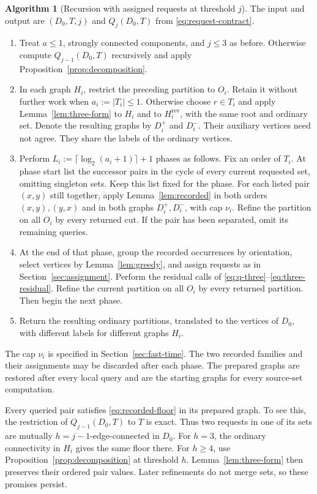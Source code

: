 \documentclass[11pt]{article}
\theoremstyle{definition}
\newtheorem{algorithm}[theorem]{Algorithm}
\theoremstyle{remark}
\newcommand{\rev}[1]{#1^{\mathrm{rev}}}
\begin{document}
\begin{algorithm}[Recursion with assigned requests at threshold \(j\)]
\label{alg:fast}
The input and output are \((D_0,T,j)\) and \(Q_j(D_0,T)\) from \eqref{eq:request-contract}.
\begin{enumerate}
\item Treat \(a\le1\), strongly connected components, and \(j\le3\) as before. Otherwise compute \(Q_{j-1}(D_0,T)\) recursively and apply Proposition~\ref{prop:decomposition}.
\item In each graph \(H_i\), restrict the preceding partition to \(O_i\). Retain it without further work when \(a_i:=|T_i|\le1\). Otherwise choose \(r\in T_i\) and apply Lemma~\ref{lem:three-form} to \(H_i\) and to \(\rev H_i\), with the same root and ordinary set. Denote the resulting graphs by \(D_i^+\) and \(D_i^-\). Their auxiliary vertices need not agree. They share the labels of the ordinary vertices.
\item Perform \(L_i:=\lceil\log_2(a_i+1)\rceil+1\) phases as follows. Fix an order of \(T_i\). At phase start list the successor pairs in the cycle of every current requested set, omitting singleton sets. Keep this list fixed for the phase. For each listed pair \((x,y)\) still together, apply Lemma~\ref{lem:recorded} in both orders \((x,y),(y,x)\) and in both graphs \(D_i^+,D_i^-\), with cap \(\nu_i\). Refine the partition on all \(O_i\) by every returned cut. If the pair has been separated, omit its remaining queries.
\item At the end of that phase, group the recorded occurrences by orientation, select vertices by Lemma~\ref{lem:greedy}, and assign requests as in Section~\ref{sec:assignment}. Perform the residual calls of \eqref{eq:q-three}--\eqref{eq:three-residual}. Refine the current partition on all \(O_i\) by every returned partition. Then begin the next phase.
\item Return the resulting ordinary partitions, translated to the vertices of \(D_0\), with different labels for different graphs \(H_i\).
\end{enumerate}
The cap \(\nu_i\) is specified in Section~\ref{sec:fast-time}. The two recorded families and their assignments may be discarded after each phase. The prepared graphs are restored after every local query and are the starting graphs for every source-set computation.
\end{algorithm}

Every queried pair satisfies \eqref{eq:recorded-floor} in its prepared graph. To see this, the restriction of \(Q_{j-1}(D_0,T)\) to \(T\) is exact. Thus two requests in one of its sets are mutually \(h=j-1\)-edge-connected in \(D_0\). For \(h=3\), the ordinary connectivity in \(H_i\) gives the same floor there. For \(h\ge4\), use Proposition~\ref{prop:decomposition} at threshold \(h\). Lemma~\ref{lem:three-form} then preserves their ordered pair values. Later refinements do not merge sets, so these promises persist.
\end{document}
